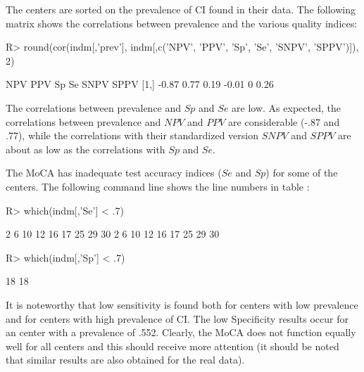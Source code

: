 \documentclass[
  nojss]{jss}
\begin{document}
The centers are sorted on the prevalence of CI found in their data. The
following matrix shows the correlations between prevalence and the
various quality indices:

\begin{CodeChunk}

\begin{CodeInput}
R> round(cor(indm[,'prev'], indm[,c('NPV', 'PPV', 'Sp', 'Se', 'SNPV', 'SPPV')]), 2)
\end{CodeInput}

\begin{CodeOutput}
       NPV  PPV   Sp    Se SNPV SPPV
[1,] -0.87 0.77 0.19 -0.01    0 0.26
\end{CodeOutput}
\end{CodeChunk}

The correlations between prevalence and \(Sp\) and \(Se\) are low. As
expected, the correlations between prevalence and \(NPV\) and \(PPV\)
are considerable (-.87 and .77), while the correlations with their
standardized version \(SNPV\) and \(SPPV\) are about as low as the
correlations with \(Sp\) and \(Se\).

The MoCA has inadequate test accuracy indices (\(Se\) and \(Sp\)) for
some of the centers. The following command line shows the line numbers
in table :

\begin{CodeChunk}

\begin{CodeInput}
R> which(indm[,'Se'] < .7)
\end{CodeInput}

\begin{CodeOutput}
 2  6 10 12 16 17 25 29 30 
 2  6 10 12 16 17 25 29 30 
\end{CodeOutput}

\begin{CodeInput}
R> which(indm[,'Sp'] < .7)
\end{CodeInput}

\begin{CodeOutput}
18 
18 
\end{CodeOutput}
\end{CodeChunk}

It is noteworthy that low sensitivity is found both for centers with low
prevalence and for centers with high prevalence of CI. The low
Specificity results occur for an center with a prevalence of .552.
Clearly, the MoCA does not function equally well for all centers and
this should receive more attention (it should be noted that similar
results are also obtained for the real data).
\end{document}
